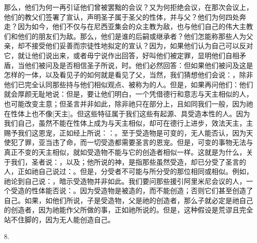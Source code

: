 那么，他们为何一再引证他们曾被罢黜的会议？又为何拒绝会议，在那次会议上，他们的教父们签署了宣认，声明圣子属于圣父的性体，并与父？他们为何四处奔走？因为如今，他们不仅与在尼西亚集会的众主教为敌，也与他们自己的伟大主教们和他们的朋友们为敌。那么，他们是谁的后嗣或继承者？他们怎能称那些人为父亲，却不接受他们妥善而宗徒性地拟定的宣认？因为，如果他们认为自己可以反对它，就让他们说出来，或者毋宁说作出回答，好叫他们被定罪，显明他们自相矛盾，当他们被问及是否相信圣子所说，时。他们必然回答：但如果他们被问及这是怎样的一体，以及看见子的如何就是看见了父，当然，我们猜想他们会说：，除非他们已完全认同那些持与他们相似观点、被称为的人。但是，如果再问他们：他们就会厚颜无耻地说：但是，要让他们明白，一个凭借德行和意志与天主相似的人，也可能改变主意；但圣言并非如此，除非祂只在部分上，且如同我们一般，因为祂在性体上也不像[天主]。但这些特征属于我们这些有起源、具受造本性的人。因为我们自己，虽然不能在性体上成为与天主相似，却可在德行上进步，效法天主，主赐予我们这恩宠，正如经上所说：：。至于受造物是可变的，无人能否认，因为天使犯了罪，亚当违了命，而一切受造都需要圣言的恩宠。但是，可变的事物无法与真正不变的天主相似，就如受造物不能与它的创造者相似一样。这就是为什么，关于我们，圣者说：，以及；他所说的神，是指那些虽然受造，却已分受了圣言的人，正如祂自己说过：。但是，分受者不可能与所分受的那位相同或相似。例如，祂论到自己说：，暗示受造物并非如此。我们要问那些援引阿里米尼会议的人，一个受造的性体能否说：。因为受造物是被造的，而不能创造；否则它们甚至创造了自己。如果，如他们所说，子是受造物，父是祂的创造者，那么子就必定是祂自己的创造者，因为祂能作父所做的事，正如祂所说的。但是，这种假设是荒谬且完全站不住脚的，因为无人能创造自己。\par

8. \par

